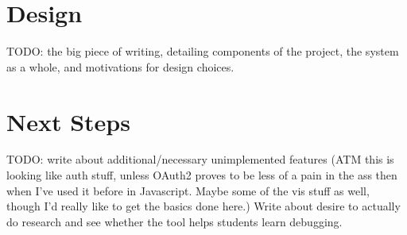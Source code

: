 \documentclass[12pt]{article}
\begin{document}
\section{Design}

TODO: the big piece of writing, detailing components of the project,
the system as a whole, and motivations for design choices.

\section{Next Steps}

TODO: write about additional/necessary unimplemented features (ATM
this is looking like auth stuff, unless OAuth2 proves to be less of a
pain in the ass then when I've used it before in Javascript.  Maybe
some of the vis stuff as well, though I'd really like to get the
basics done here.)  Write about desire to actually do research and see
whether the tool helps students learn debugging.

\pagebreak

{}
\end{document}
